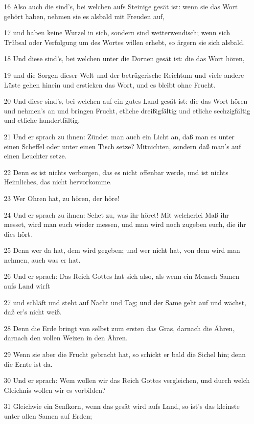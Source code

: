 \par 16 Also auch die sind's, bei welchen aufs Steinige gesät ist: wenn sie das Wort gehört haben, nehmen sie es alsbald mit Freuden auf,
\par 17 und haben keine Wurzel in sich, sondern sind wetterwendisch; wenn sich Trübsal oder Verfolgung um des Wortes willen erhebt, so ärgern sie sich alsbald.
\par 18 Und diese sind's, bei welchen unter die Dornen gesät ist: die das Wort hören,
\par 19 und die Sorgen dieser Welt und der betrügerische Reichtum und viele andere Lüste gehen hinein und ersticken das Wort, und es bleibt ohne Frucht.
\par 20 Und diese sind's, bei welchen auf ein gutes Land gesät ist: die das Wort hören und nehmen's an und bringen Frucht, etliche dreißigfältig und etliche sechzigfältig und etliche hundertfältig.
\par 21 Und er sprach zu ihnen: Zündet man auch ein Licht an, daß man es unter einen Scheffel oder unter einen Tisch setze? Mitnichten, sondern daß man's auf einen Leuchter setze.
\par 22 Denn es ist nichts verborgen, das es nicht offenbar werde, und ist nichts Heimliches, das nicht hervorkomme.
\par 23 Wer Ohren hat, zu hören, der höre!
\par 24 Und er sprach zu ihnen: Sehet zu, was ihr höret! Mit welcherlei Maß ihr messet, wird man euch wieder messen, und man wird noch zugeben euch, die ihr dies hört.
\par 25 Denn wer da hat, dem wird gegeben; und wer nicht hat, von dem wird man nehmen, auch was er hat.
\par 26 Und er sprach: Das Reich Gottes hat sich also, als wenn ein Mensch Samen aufs Land wirft
\par 27 und schläft und steht auf Nacht und Tag; und der Same geht auf und wächst, daß er's nicht weiß.
\par 28 Denn die Erde bringt von selbst zum ersten das Gras, darnach die Ähren, darnach den vollen Weizen in den Ähren.
\par 29 Wenn sie aber die Frucht gebracht hat, so schickt er bald die Sichel hin; denn die Ernte ist da.
\par 30 Und er sprach: Wem wollen wir das Reich Gottes vergleichen, und durch welch Gleichnis wollen wir es vorbilden?
\par 31 Gleichwie ein Senfkorn, wenn das gesät wird aufs Land, so ist's das kleinste unter allen Samen auf Erden;
